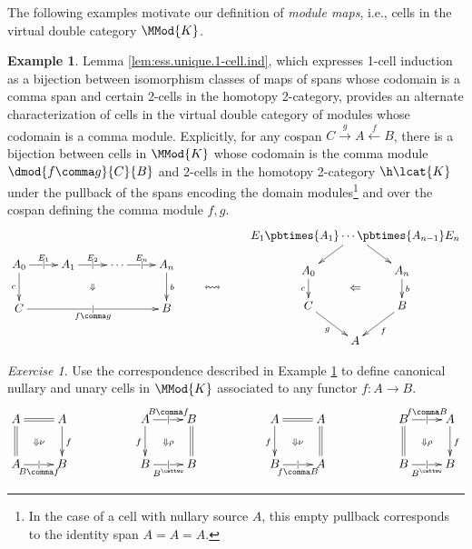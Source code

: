 \documentclass[12pt,reqno]{amsart}
\theoremstyle{plain}
\theoremstyle{definition}
\newtheorem{ex}[thm]{Example}
\theoremstyle{remark}
\newtheorem{exs}[thm]{Exercise}
\numberwithin{equation}{subsection}
\begin{document}
The following examples motivate our definition of \emph{module maps}, i.e., cells in the virtual double category $\MMod{K}$.

\begin{ex}\label{ex:cells-above-a-comma} Lemma  \ref{lem:ess.unique.1-cell.ind}, which expresses 1-cell induction as a bijection between isomorphism classes of maps of spans whose codomain is a comma span and certain 2-cells in the homotopy 2-category,  provides an alternate characterization of cells in the virtual double category of modules whose codomain is a comma module. Explicitly, for any cospan  $C \xrightarrow{g} A \xleftarrow{f} B$, there is a bijection between cells in $\MMod{K}$ whose codomain is the comma module $\dmod{f \comma g}{C}{B}$ and 2-cells in the homotopy 2-category $\h\lcat{K}$ under the pullback of the spans encoding the domain modules\footnote{In the case of a cell with nullary source $A$, this empty pullback corresponds to the identity span $A = A = A$.} and  over the cospan defining the comma module $f \comma g$. 
\[ \vcenter{ \xymatrix{ A_0 \ar[d]_{c} \ar[r]|{\mid}^{E_1} & A_1 \ar[r]|{\mid}^{E_2}  \ar@{}[dr]|{\Downarrow} & \cdots \ar[r]|{\mid}^{E_n} & A_n \ar[d]^b \\ C \ar[rrr]|{\mid}_{f \comma g} & & & B}}\qquad \leftrightsquigarrow\qquad \vcenter{ \xymatrix@!0@C=40pt@R=30pt{ & E_1 \pbtimes{A_1} \cdots \pbtimes{A_{n-1}} E_n \ar[dl] \ar[dr] \ar@{}[ddd]|{\displaystyle\Leftarrow} \\ A_0  \ar[d]_c & & A_n \ar[d]^b \\ C \ar[dr]_g & & B \ar[dl]^f \\ & A}}\] 
\end{ex}

\begin{exs}\label{exs:sample-cells} Use the correspondence described in Example \ref{ex:cells-above-a-comma} to define canonical nullary and unary cells in $\MMod{K}$ associated to any functor $f \colon A \to B$.
\[ \xymatrix {  A \ar@{=}[r] \ar@{=}[d] \ar@{}[dr]|{\Downarrow\nu} & A \ar[d]^f & & A \ar[d]_f \ar[r]|\mid^{B \comma f} \ar@{}[dr]|{\Downarrow\rho} & B \ar@{=}[d] & & A \ar@{=}[r] \ar[d]_f \ar@{}[dr]|{\Downarrow\nu} & A \ar@{=}[d] & & B \ar@{=}[d] \ar[r]|\mid^{f \comma B} \ar@{}[dr]|{\Downarrow\rho} & A \ar[d]^f   \\ A \ar[r]_{B \comma f}|{\mid}  & B & & B \ar[r]|\mid_{B^\cattwo} & B & & B \ar[r]|\mid_{f \comma B} & A & & B \ar[r]|\mid_{B^\cattwo} & B}\]
\end{exs}
\end{document}
